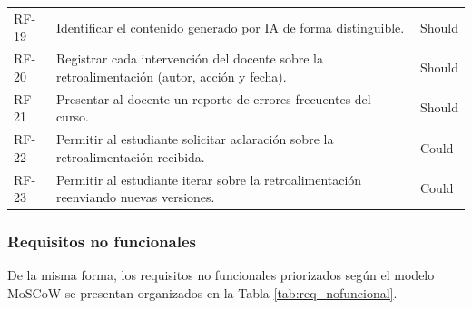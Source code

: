 \documentclass[letterpaper, 10 pt, conference]{ieeeconf}
\begin{document}
\begin{table}[ht]
\begin{tabular}{lp{5.0cm}l}
		RF-19 & Identificar el contenido generado por IA de forma distinguible. & Should \\
		RF-20 & Registrar cada intervención del docente sobre la retroalimentación (autor, acción y fecha). & Should \\
		RF-21 & Presentar al docente un reporte de errores frecuentes del curso. & Should \\
		RF-22 & Permitir al estudiante solicitar aclaración sobre la retroalimentación recibida. & Could \\
		RF-23 & Permitir al estudiante iterar sobre la retroalimentación reenviando nuevas versiones. & Could \\
		\hline
	\end{tabular}
\end{table}

\subsubsection{Requisitos no funcionales}
De la misma forma, los requisitos no funcionales priorizados según el modelo MoSCoW se presentan organizados en la Tabla \ref{tab:req_nofuncional}.
\end{document}
